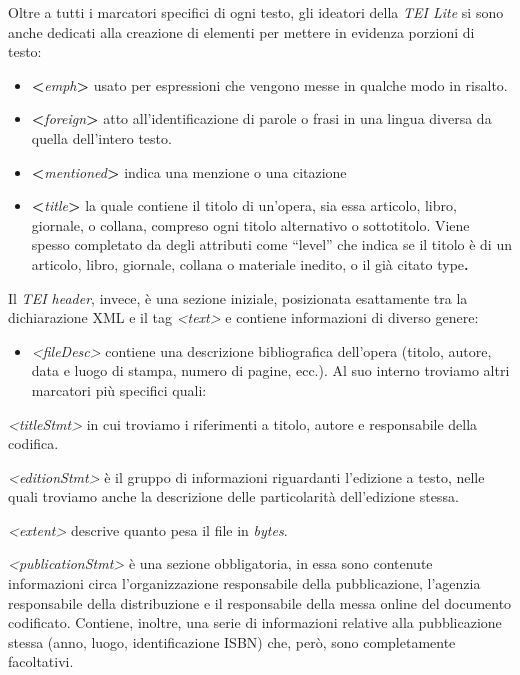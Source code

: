 \documentclass[
  b5paper,
  twoside,
  12pt,
  chapterprefix=false,
  bibliography=totocnumbered,
  parskip=false]{scrbook}
\providecommand{\tightlist}{%
  \setlength{\itemsep}{0pt}\setlength{\parskip}{0pt}}
\begin{document}
Oltre a tutti i marcatori specifici di ogni testo, gli ideatori della
\emph{TEI Lite} si sono anche dedicati alla creazione di elementi per mettere
in evidenza porzioni di testo:

\begin{itemize}
\item
  \textbf{\textless{}}\emph{emph}\textbf{\textgreater{}} usato per espressioni che vengono messe in
  qualche modo in risalto.
\item
  \textbf{\textless{}}\emph{foreign}\textbf{\textgreater{}} atto all'identificazione di parole o frasi in
  una lingua diversa da quella dell'intero testo.
\item
  \textbf{\textless{}}\emph{mentioned}\textbf{\textgreater{}} indica una menzione o una citazione
\item
  \textbf{\textless{}}\emph{title}\textbf{\textgreater{}} la quale contiene il titolo di un'opera, sia
  essa articolo, libro, giornale, o collana, compreso ogni titolo
  alternativo o sottotitolo. Viene spesso completato da degli
  attributi come \enquote{level} che indica se il titolo è di un articolo,
  libro, giornale, collana o materiale inedito, o il già citato
  type\textbf{.}
\end{itemize}

Il \emph{TEI header}, invece, è una sezione iniziale, posizionata esattamente
tra la dichiarazione XML e il tag \emph{\textless text\textgreater{}} e contiene informazioni di
diverso genere:

\begin{itemize}
\tightlist
\item
  \emph{\textless fileDesc\textgreater{}} contiene una descrizione bibliografica dell'opera
  (titolo, autore, data e luogo di stampa, numero di pagine, ecc.). Al
  suo interno troviamo altri marcatori più specifici quali:
\end{itemize}

\emph{\textless titleStmt\textgreater{}} in cui troviamo i riferimenti a titolo, autore e
responsabile della codifica.

\emph{\textless editionStmt\textgreater{}} è il gruppo di informazioni riguardanti l'edizione a
testo, nelle quali troviamo anche la descrizione delle particolarità
dell'edizione stessa.

\emph{\textless extent\textgreater{}} descrive quanto pesa il file in \emph{bytes}.

\emph{\textless publicationStmt\textgreater{}} è una sezione obbligatoria, in essa sono contenute
informazioni circa l'organizzazione responsabile della pubblicazione,
l'agenzia responsabile della distribuzione e il responsabile della messa
online del documento codificato. Contiene, inoltre, una serie di
informazioni relative alla pubblicazione stessa (anno, luogo,
identificazione ISBN) che, però, sono completamente facoltativi.
\end{document}
